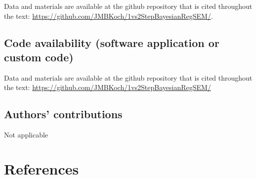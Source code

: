 \documentclass[
  man, donotrepeattitle,floatsintext]{apa6}
\begin{document}
Data and materials are available at the github repository that is cited throughout the text: \url{https://github.com/JMBKoch/1vs2StepBayesianRegSEM/}.

\subsection{Code availability (software application or custom code)}\label{code-availability-software-application-or-custom-code}

Data and materials are available at the github repository that is cited throughout the
text: \url{https://github.com/JMBKoch/1vs2StepBayesianRegSEM/}

\subsection{Authors' contributions}\label{authors-contributions}

Not applicable

\begingroup
\setlength{\parindent}{-0.5in}
\setlength{\leftskip}{0.5in}

\section*{References}
\end{document}

